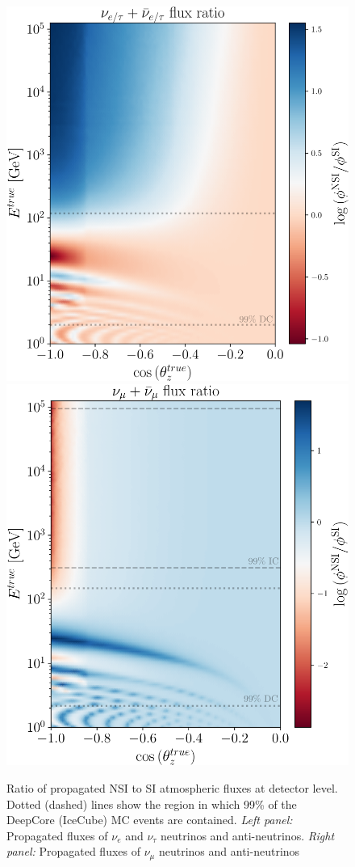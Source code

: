 \documentclass[draft=True]{revtex4-2}
\renewcommand{\ne}{\nu_e}
\newcommand{\nm}{\nu_\mu}
\newcommand{\nt}{\nu_\tau}
\begin{document}
\begin{figure}[!tb]
   \begin{center}
      \includegraphics[width=0.4\linewidth]{figures/cascade_flux_ratio.pdf}
      \includegraphics[width=0.4\linewidth]{figures/track_flux_ratio.pdf}
   \end{center}
   \caption{Ratio of propagated NSI to SI atmospheric fluxes at detector level. Dotted (dashed) lines show the region in which 99\% of the 
   DeepCore (IceCube) MC events are contained. \emph{Left panel:} Propagated fluxes of $\ne$ and $\nt$ neutrinos and anti-neutrinos. 
   \emph{Right panel:} Propagated fluxes of $\nm$ neutrinos and anti-neutrinos}\label{fig:flux_ratio}%
\end{figure}
\end{document}
